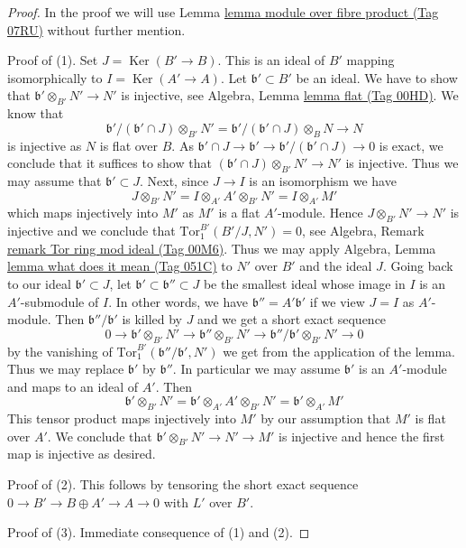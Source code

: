 \documentclass{amsart}
\theoremstyle{plain}
\theoremstyle{definition}
\theoremstyle{remark}
\numberwithin{equation}{subsection}
\def\Ker{\mathop{\mathrm{Ker}}}
\begin{document}
\begin{proof}
In the proof we will use Lemma \href{https://stacks.math.columbia.edu/tag/07RU}{lemma module over fibre product (Tag 07RU)}
without further mention.

\medskip\noindent
Proof of (1). Set $J = \Ker(B' \to B)$. This is an ideal of $B'$
mapping isomorphically to $I = \Ker(A' \to A)$.
Let $\mathfrak b' \subset B'$ be an ideal.
We have to show that $\mathfrak b' \otimes_{B'} N' \to N'$
is injective, see Algebra, Lemma \href{https://stacks.math.columbia.edu/tag/00HD}{lemma flat (Tag 00HD)}.
We know that
$$
\mathfrak b'/(\mathfrak b' \cap J) \otimes_{B'} N' =
\mathfrak b'/(\mathfrak b' \cap J) \otimes_B N \to N
$$
is injective as $N$ is flat over $B$. As
$\mathfrak b' \cap J \to \mathfrak b' \to
\mathfrak b'/(\mathfrak b' \cap J) \to 0$ is exact, we
conclude that it suffices to show that
$(\mathfrak b' \cap J) \otimes_{B'} N' \to N'$
is injective. Thus we may assume that $\mathfrak b' \subset J$.
Next, since $J \to I$ is an isomorphism we have
$$
J \otimes_{B'} N' =
I \otimes_{A'} A' \otimes_{B'} N' =
I \otimes_{A'} M'
$$
which maps injectively into $M'$ as $M'$ is a flat $A'$-module.
Hence $J \otimes_{B'} N' \to N'$ is injective and we conclude
that $\text{Tor}_1^{B'}(B'/J, N') = 0$, see
Algebra, Remark \href{https://stacks.math.columbia.edu/tag/00M6}{remark Tor ring mod ideal (Tag 00M6)}.
Thus we may apply Algebra, Lemma \href{https://stacks.math.columbia.edu/tag/051C}{lemma what does it mean (Tag 051C)}
to $N'$ over $B'$ and the ideal $J$.
Going back to our ideal $\mathfrak b' \subset J$, let
$\mathfrak b' \subset \mathfrak b'' \subset J$ be the smallest ideal
whose image in $I$ is an $A'$-submodule of $I$. In other words,
we have $\mathfrak b'' = A' \mathfrak b'$ if we view $J = I$
as $A'$-module. Then $\mathfrak b''/\mathfrak b'$ is killed
by $J$ and we get a short exact sequence
$$
0 \to \mathfrak b' \otimes_{B'} N' \to
\mathfrak b'' \otimes_{B'} N' \to
\mathfrak b''/\mathfrak b' \otimes_{B'} N' \to 0
$$
by the vanishing of $\text{Tor}_1^{B'}(\mathfrak b''/\mathfrak b', N')$
we get from the application of the lemma.
Thus we may replace $\mathfrak b'$ by $\mathfrak b''$.
In particular we may assume $\mathfrak b'$ is an $A'$-module
and maps to an ideal of $A'$. Then
$$
\mathfrak b' \otimes_{B'} N' =
\mathfrak b' \otimes_{A'} A' \otimes_{B'} N' =
\mathfrak b' \otimes_{A'} M'
$$
This tensor product maps injectively into $M'$ by our assumption that
$M'$ is flat over $A'$. We conclude that
$\mathfrak b' \otimes_{B'} N' \to N' \to M'$ is injective
and hence the first map is injective as desired.

\medskip\noindent
Proof of (2). This follows by tensoring the short exact sequence
$0 \to B' \to B \oplus A' \to A \to 0$ with $L'$ over $B'$.

\medskip\noindent
Proof of (3). Immediate consequence of (1) and (2).
\end{proof}
\end{document}
